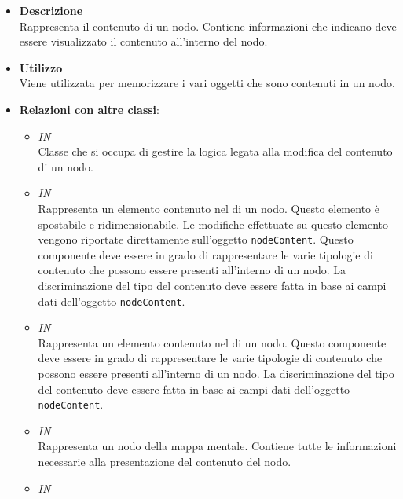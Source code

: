 \begin{itemize}
\item \textbf{Descrizione}\\
Rappresenta il contenuto di un nodo. Contiene informazioni che indicano deve essere visualizzato il contenuto all’interno del nodo.
\item \textbf{Utilizzo}\\
Viene utilizzata per memorizzare i vari oggetti che sono contenuti in un nodo.
\item \textbf{Relazioni con altre classi}:
\begin{itemize}
\item \textit{IN} \hyperref[\nogloxy{Premi::Front-End::Controllers::NodeContentsEditorController}]{}\\
Classe che si occupa di gestire la logica legata alla modifica del contenuto di un nodo.
\item \textit{IN} \hyperref[\nogloxy{Premi::Front-End::Directives::premiEditableNodeContent}]{}\\
Rappresenta un elemento contenuto nel  di un nodo. Questo elemento è spostabile e ridimensionabile. Le modifiche effettuate su questo elemento vengono riportate direttamente sull’oggetto \texttt{nodeContent}.
Questo componente deve essere in grado di rappresentare le varie tipologie di contenuto che possono essere presenti all’interno di un nodo. La discriminazione del tipo del contenuto deve essere fatta in base ai campi dati dell’oggetto \texttt{nodeContent}.
\item \textit{IN} \hyperref[\nogloxy{Premi::Front-End::Directives::premiNodeContent}]{}\\
Rappresenta un elemento contenuto nel  di un nodo.
Questo componente deve essere in grado di rappresentare le varie tipologie di contenuto che possono essere presenti all’interno di un nodo.  La discriminazione del tipo del contenuto deve essere fatta in base ai campi dati dell’oggetto \texttt{nodeContent}.
\item \textit{IN} \hyperref[\nogloxy{Premi::Front-End::Model::Node}]{}\\
Rappresenta un nodo della mappa mentale. Contiene tutte le informazioni necessarie alla presentazione del contenuto del nodo.
\item \textit{IN} \hyperref[\nogloxy{Premi::Front-End::Model::PresentationNode}]{}\\

\end{itemize}
\end{itemize}
